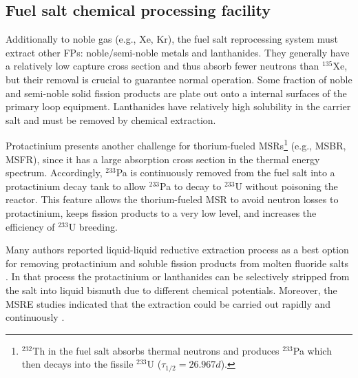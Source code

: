 \subsection{Fuel salt chemical processing facility} \label{sec:chemical_processing}
Additionally to noble gas (e.g., Xe, Kr), the fuel salt reprocessing system  
must extract other \glspl{FP}: noble/semi-noble metals and lanthanides. They  
generally have a relatively low capture cross section and thus absorb fewer 
neutrons than $^{135}$Xe, but their removal is crucial to guarantee normal  
operation. Some fraction of noble and semi-noble solid fission products are 
plate out onto a internal surfaces of the primary loop equipment. Lanthanides 
have relatively high solubility in the carrier salt and must be removed by 
chemical extraction. 

Protactinium presents another challenge for thorium-fueled 
\glspl{MSR}\footnote{$^{232}$Th in the fuel salt absorbs thermal neutrons 
and produces $^{233}$Pa which then decays into the fissile $^{233}$U 
($\tau_{1/2}=26.967d$).} (e.g., \gls{MSBR}, \gls{MSFR}), since it has a large 
absorption cross section in  the thermal energy spectrum. Accordingly, 
$^{233}$Pa is continuously removed from the fuel salt into a protactinium
decay tank to allow $^{233}$Pa to decay to $^{233}$U without poisoning the 
reactor. This feature allows the thorium-fueled \gls{MSR} to avoid neutron 
losses to protactinium, keeps fission products to a very low level, and 
increases the efficiency of $^{233}$U breeding. 

Many authors reported liquid-liquid reductive extraction process as a best 
option for removing protactinium and soluble fission products from 
molten fluoride salts \cite{briggs_molten-salt_1969, delpech_molten_2010, 
doligez_coupled_2014}. In that process the protactinium or lanthanides can be 
selectively stripped from the salt into liquid bismuth due to different 
chemical potentials. Moreover, the \gls{MSRE} studies indicated that the 
extraction could be carried out rapidly and continuously  
\cite{whatley_engineering_1970-1}.

